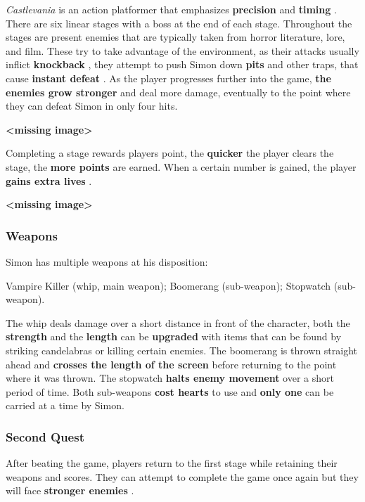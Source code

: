 \documentclass[a4paper,10pt]{book}
\begin{document}
 \textit{Castlevania } is an action platformer that emphasizes  \textbf{precision } 
              and  \textbf{timing } . There are six linear stages with a boss at the end of
              each stage. Throughout the stages are present enemies that are
              typically taken from horror literature, lore, and film. These try to
              take advantage of the environment, as their attacks usually inflict
               \textbf{knockback } , they attempt to push Simon down  \textbf{pits }  and other traps, that
              cause  \textbf{instant defeat } . As the player progresses further into the game,
               \textbf{the enemies grow stronger }  and deal more damage, eventually to the
              point where they can defeat Simon in only four hits. 
 
 
 \textbf{<missing image>}
 
 Completing a stage rewards players point, the  \textbf{quicker }  the player
          clears the stage, the  \textbf{more points }  are earned. When a certain number is
          gained, the player  \textbf{gains extra lives } . 
 
 \textbf{<missing image>}
 
 \subsubsection{Weapons }
 Simon has multiple weapons at his disposition:
           
 Vampire Killer (whip, main weapon); 
 Boomerang (sub-weapon); 
 Stopwatch (sub-weapon). 
 
 
 The whip deals damage over a short distance in front of the
          character, both the  \textbf{strength }  and the  \textbf{length }  can be
           \textbf{upgraded }  with items that can be found by striking candelabras
          or killing certain enemies. 
 The boomerang is thrown straight ahead and  \textbf{crosses the length of
          the screen }  before returning to the point where it was thrown. 
 The stopwatch  \textbf{halts enemy movement }  over a short period of time. 
 Both sub-weapons  \textbf{cost hearts }  to use and  \textbf{only one }  can be carried at
          a time by Simon. 
 \subsubsection{Second Quest }
 After beating the game, players return to the first stage while
             retaining their weapons and scores. They can attempt to complete the
             game once again but they will face  \textbf{stronger enemies } . 
 
\end{document}
